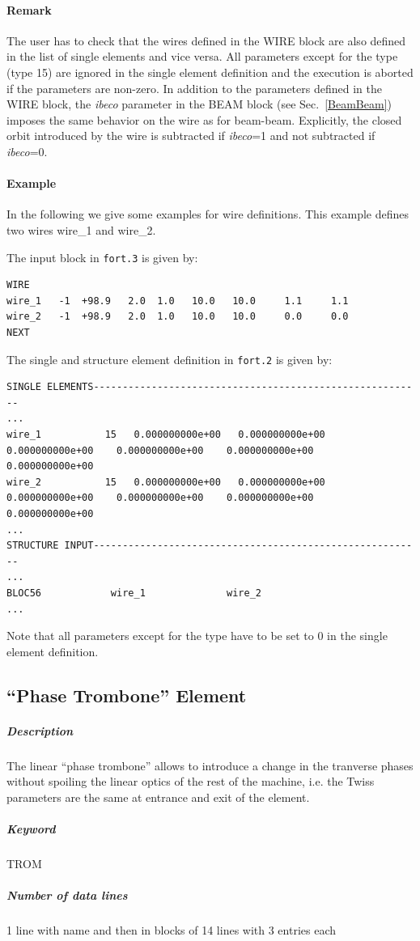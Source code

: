 \paragraph{Remark} The user has to check that the wires defined in the WIRE block are also defined in the list of single elements and vice versa. All parameters except for the type (type 15) are ignored in the single element definition and the execution is aborted if the parameters are non-zero. In addition to the parameters defined in the WIRE block, the \emph{ibeco} parameter in the BEAM block (see Sec.~\ref{BeamBeam}) imposes the same behavior on the wire as for beam-beam. Explicitly, the closed orbit introduced by the wire is subtracted if \emph{ibeco}=1 and not subtracted if \emph{ibeco}=0.

\paragraph{Example} In the following we give some examples for wire definitions. This example defines two wires wire\_1 and wire\_2.

The input block in \verb|fort.3| is given by:
\begin{verbatim}
WIRE
wire_1   -1  +98.9   2.0  1.0   10.0   10.0     1.1     1.1
wire_2   -1  +98.9   2.0  1.0   10.0   10.0     0.0     0.0
NEXT
\end{verbatim}
The single and structure element definition in \verb|fort.2| is given by:
\begin{verbatim}
SINGLE ELEMENTS---------------------------------------------------------
...
wire_1           15   0.000000000e+00   0.000000000e+00 
0.000000000e+00    0.000000000e+00    0.000000000e+00    0.000000000e+00
wire_2           15   0.000000000e+00   0.000000000e+00 
0.000000000e+00    0.000000000e+00    0.000000000e+00    0.000000000e+00
...
STRUCTURE INPUT---------------------------------------------------------
...
BLOC56            wire_1              wire_2
...
\end{verbatim}
Note that all parameters except for the type have to be set to 0 in the single element definition.

\subsection{``Phase Trombone'' Element} \label{Trombone}

\subparagraph{Description} The linear ``phase trombone'' allows to
introduce a change in the tranverse phases without spoiling the linear
optics of the rest of the machine, i.e. the Twiss parameters are the
same at entrance and exit of the element.  
\subparagraph{Keyword} TROM
\subparagraph{Number of data lines} 1 line with name and then in
blocks of 14 lines with 3 entries each

